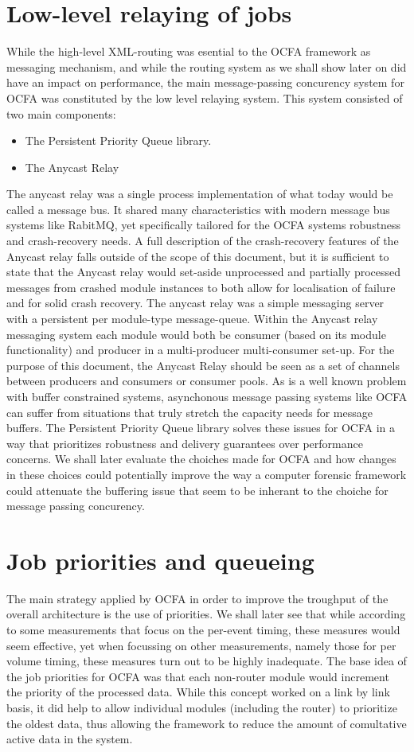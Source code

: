\section{Low-level relaying of jobs}
While the high-level XML-routing was esential to the OCFA framework as messaging mechanism, and while the routing system as we shall show later on did have an impact on performance, the main message-passing concurency system for OCFA was constituted by the low level relaying system. This system consisted of two main components:
\begin{itemize}
\item The Persistent Priority Queue library.
\item The Anycast Relay
\end{itemize}
The anycast relay was a single process implementation of what today would be called a message bus. It shared many characteristics with modern message bus systems like RabitMQ, yet specifically tailored for the OCFA systems robustness and crash-recovery needs. A full description of the crash-recovery features of the Anycast relay falls outside of the scope of this document, but it is sufficient to state that the Anycast relay would set-aside unprocessed and partially processed messages from crashed module instances to both allow for localisation of failure and for solid crash recovery. The anycast relay was a simple messaging server with a persistent per module-type message-queue. Within the 
Anycast relay messaging system each module would both be consumer (based on its module functionality) and producer in a multi-producer multi-consumer set-up. 
For the purpose of this document, the Anycast Relay should be seen as a set of channels between producers and consumers or consumer pools. As is a well known problem with buffer constrained systems, asynchonous message passing systems like OCFA can suffer from situations that truly stretch the capacity needs for message buffers. The Persistent Priority Queue library solves these issues for OCFA in a way that prioritizes robustness and delivery guarantees over performance concerns. We shall later evaluate the choiches made for OCFA and how changes in these choices could potentially improve the way a computer forensic framework could attenuate the buffering issue that seem to be inherant to the choiche for message passing concurency. 
\section{Job priorities and queueing}
The main strategy applied by OCFA in order to improve the troughput of the overall architecture is the use of priorities. We shall later see that while according to some measurements that focus on the per-event timing, these measures would seem effective, yet when focussing on other measurements, namely those for per volume timing, these measures turn out to be highly inadequate. The base idea of the job priorities for OCFA was that each non-router module would increment the priority of the processed data. While this concept worked on a link by link basis, it did help to allow individual modules (including the router) to prioritize the oldest data, thus allowing the framework to reduce the amount of comultative active data in the system. 
